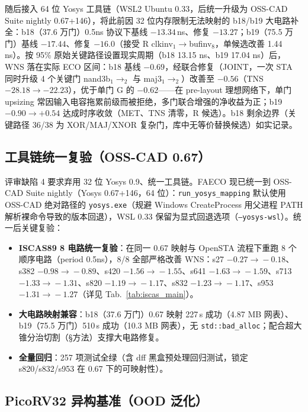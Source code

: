 \documentclass[journal]{IEEEtran}
\begin{document}
随后接入 64 位 Yosys 工具链（WSL2 Ubuntu 0.33，后统一升级为 OSS-CAD Suite nightly 0.67+146），将此前因 32 位内存限制无法映射的 b18/b19 大电路补全：b18（37.6 万门）0.5ns 协议下基线 $-13.34\,$ns、修复 $-13.27$；b19（75.5 万门）基线 $-17.44$、修复 $-16.0$（接受 R clkinv$_1$$\rightarrow$bufinv$_8$，单候选改善 1.44 ns）。按 95\% 原始关键路径设置现实周期（b18 13.15 ns、b19 17.04 ns）后，WNS 落在实际 ECO 区间：b18 基线 $-0.69$，经联合修复（JOINT，一次 STA 同时升级 4 个关键门 nand3b$_1$$\rightarrow_2$ 与 maj3$_1$$\rightarrow_2$）改善至 $-0.56$（TNS $-28.18\rightarrow-22.23$），优于单门 G 的 $-0.62$——在 pre-layout 理想网络下，单门 upsizing 常因输入电容拖累前级而被拒绝，多门联合增强的净收益为正；b19 $-0.90\rightarrow+0.54$ 达成时序收敛（MET、TNS 清零，R 候选）。b18 剩余边界（关键路径 36/38 为 XOR/MAJ/XNOR 复杂门，库中无等价替换候选）如实记录。


\subsection{工具链统一复验（OSS-CAD 0.67）}\label{sec:toolchain_rerun}

评审缺陷 4 要求弃用 32 位 Yosys 0.9、统一工具链。FAECO 现已统一到 OSS-CAD Suite nightly（Yosys 0.67+146，64 位）：\texttt{run\_yosys\_mapping} 默认使用 OSS-CAD 绝对路径的 \texttt{yosys.exe}（规避 Windows CreateProcess 用父进程 PATH 解析裸命令导致的版本回退），WSL 0.33 保留为显式回退选项（\texttt{--yosys-wsl}）。统一后关键复验：

\begin{itemize}
  \item \textbf{ISCAS89 8 电路统一复验}：在同一 0.67 映射与 OpenSTA 流程下重跑 8 个顺序电路（period 0.5ns），8/8 全部严格改善 WNS：s27 $-0.27\!\rightarrow\!-0.18$、s382 $-0.98\!\rightarrow\!-0.89$、s420 $-1.56\!\rightarrow\!-1.55$、s641 $-1.63\!\rightarrow\!-1.59$、s713 $-1.33\!\rightarrow\!-1.31$、s820 $-1.19\!\rightarrow\!-1.17$、s832 $-1.23\!\rightarrow\!-1.17$、s953 $-1.31\!\rightarrow\!-1.27$（详见 Tab.~\ref{tab:iscas_main}）。
  \item \textbf{大电路映射兼容}：b18（37.6 万门）0.67 映射 227\,s 成功（4.87 MB 网表）、b19（75.5 万门）510\,s 成功（10.3 MB 网表），无 \texttt{std::bad\_alloc}；配合超大锥分治切割（\S 方法）支撑大电路修复。
  \item \textbf{全量回归}：257 项测试全绿（含 dff 黑盒预处理回归测试，锁定 s820/s832/s953 在 0.67 下的可映射性）。
\end{itemize}

\subsection{PicoRV32 异构基准（OOD 泛化）}\label{sec:ood}
\end{document}
